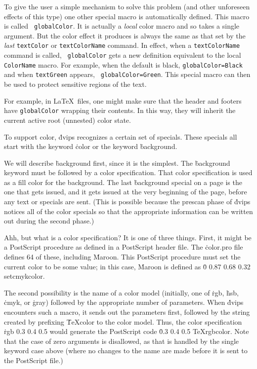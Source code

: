 To give the user a simple mechanism to solve this problem (and other
unforeseen effects of this type) one other special macro is
automatically defined.  This macro is called {\tt\ttbackslash
globalColor}.  It is actually a {\it local\/} color macro and so takes
a single argument.  But the color effect it produces is always the
same as that set by the {\it last\/} {\tt\ttbackslash textColor} or
{\tt\ttbackslash textColorName} command.  In effect, when a
{\tt\ttbackslash textColorName} command is called, {\tt\ttbackslash
globalColor} gets a new definition equivalent to the local
{\tt\ttbackslash ColorName} macro.  For example, when the default is
black, {\tt\ttbackslash globalColor=\ttbackslash Black} and when
{\tt\ttbackslash textGreen} appears, {\tt\ttbackslash
globalColor=\ttbackslash Green}.  This special macro can then be used
to protect sensitive regions of the text.

For example, in La\TeX\ files, one might make sure that the header and
footers have {\tt\ttbackslash globalColor} wrapping their contents.
In this way, they will inherit the current active root (unnested)
color state.


To support color, \.{dvips} recognizes a certain set of specials.
These specials all start with the keyword \.{color} or the keyword
\.{background}.

We will describe \.{background} first, since it is the simplest.
The \.{background} keyword must be followed by a color specification.
That color specification is used as a fill color for the background.
The last \.{background} special on a page is the one that gets issued,
and it gets issued at the very beginning of the page, before any
text or specials are sent.  (This is possible because the prescan
phase of \.{dvips} notices all of the color specials so that the
appropriate information can be written out during the second phase.)

Ahh, but what is a color specification?  It is one of three things.
First, it might be a PostScript procedure as defined in a PostScript header
file.  The \.{color.pro} file defines 64 of these, including
\.{Maroon}.  This PostScript procedure must set the current color to be
some value; in this case, \.{Maroon} is defined as
\.{0 0.87 0.68 0.32 setcmykcolor}.

The second possibility is the name of a color model (initially, one of
\.{rgb}, \.{hsb}, \.{cmyk}, or \.{gray}) followed by the appropriate
number of parameters.  When \.{dvips} encounters such a macro, it sends
out the parameters first, followed by the string created by prefixing
\.{TeXcolor} to the color model.  Thus, the color specification
\.{rgb 0.3 0.4 0.5} would generate the PostScript code \.{0.3 0.4 0.5
TeXrgbcolor}.  Note that the case of zero arguments is disallowed, as
that is handled by the single keyword case above (where no changes to
the name are made before it is sent to the PostScript file.)

